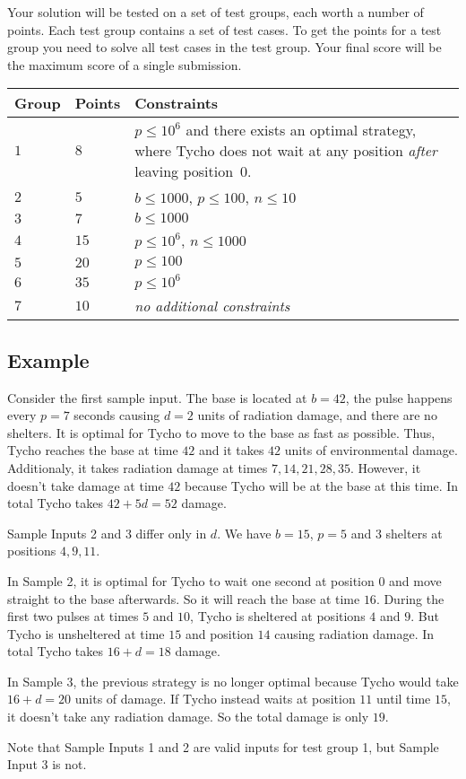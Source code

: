 Your solution will be tested on a set of test groups, each worth a number of points.
Each test group contains a set of test cases.
To get the points for a test group you need to solve all test cases in the test group.
Your final score will be the maximum score of a single submission.

\medskip
\begin{tabular}{lll}
Group & Points & Constraints \\\hline
  $1$ & $8$  & $p\leq 10^6$ and there exists an optimal strategy, where Tycho does not wait at any position \emph{after} leaving position~$0$. \\ %
  $2$ & $5$  & $b\leq 1000$, $p\leq 100$, $n\leq 10$ \\
  $3$ & $7$  & $b\leq 1000$ \\
  $4$ & $15$ & $p\leq 10^6$, $n\leq 1000$\\
  $5$ & $20$ & $p\leq 100$\\
  $6$ & $35$ & $p\leq 10^6$\\
  $7$ & $10$ & \emph{no additional constraints}
\end{tabular}

\subsection*{Example}

Consider the first sample input. The base is located at $b = 42$, the pulse happens every $p = 7$ seconds causing $d = 2$ units of radiation damage, and there are no shelters.
It is optimal for Tycho to move to the base as fast as possible. Thus, Tycho reaches the base at time $42$ and it takes $42$ units of environmental damage.
Additionaly, it takes radiation damage at times $7, 14, 21, 28, 35$. However, it doesn't take damage at time $42$ because Tycho will be at the base at this time.
In total Tycho takes $42 + 5d = 52$ damage.

Sample Inputs 2 and 3 differ only in $d$. We have $b = 15$, $p = 5$ and 3 shelters at positions $4, 9, 11$.

In Sample 2, it is optimal for Tycho to wait one second at position $0$ and move straight to the base afterwards. So it will reach the base at time $16$.
During the first two pulses at times $5$ and $10$, Tycho is sheltered at positions $4$ and $9$. But Tycho is unsheltered at time $15$ and position $14$ causing radiation damage.
In total Tycho takes $16 + d = 18$ damage.

In Sample 3, the previous strategy is no longer optimal because Tycho would take $16 + d = 20$ units of damage. If Tycho instead waits at position $11$ until time $15$, it doesn't take any radiation damage.
So the total damage is only $19$.

Note that Sample Inputs 1 and 2 are valid inputs for test group 1, but Sample Input 3 is not.